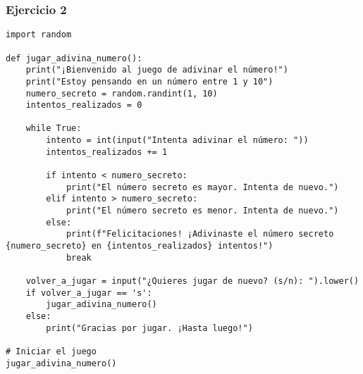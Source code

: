\documentclass[10pt,a4paper]{article}
\begin{document}
\subsubsection{Ejercicio 2}
\begin{lstlisting}
import random

def jugar_adivina_numero():
    print("¡Bienvenido al juego de adivinar el número!")
    print("Estoy pensando en un número entre 1 y 10")
    numero_secreto = random.randint(1, 10)
    intentos_realizados = 0
    
    while True:
        intento = int(input("Intenta adivinar el número: "))
        intentos_realizados += 1
        
        if intento < numero_secreto:
            print("El número secreto es mayor. Intenta de nuevo.")
        elif intento > numero_secreto:
            print("El número secreto es menor. Intenta de nuevo.")
        else:
            print(f"Felicitaciones! ¡Adivinaste el número secreto {numero_secreto} en {intentos_realizados} intentos!")
            break

    volver_a_jugar = input("¿Quieres jugar de nuevo? (s/n): ").lower()
    if volver_a_jugar == 's':
        jugar_adivina_numero()
    else:
        print("Gracias por jugar. ¡Hasta luego!")

# Iniciar el juego
jugar_adivina_numero()
\end{lstlisting}
\end{document}
